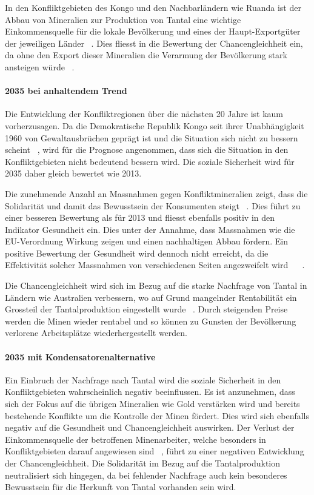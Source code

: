 In den Konfliktgebieten des Kongo und den Nachbarländern wie Ruanda ist der Abbau von 
Mineralien zur Produktion von Tantal eine wichtige Einkommensquelle für die lokale Bevölkerung
und eines der Haupt-Exportgüter der jeweiligen Länder ~\cite{OECProdu81}. Dies fliesst in
die Bewertung der Chancengleichheit ein, da ohne den Export dieser Mineralien die Verarmung
der Bevölkerung stark ansteigen würde ~\cite{DRCongo35}.

\paragraph{2035 bei anhaltendem Trend} Die Entwicklung der Konfliktregionen über die nächsten 20 Jahre
ist kaum vorherzusagen. Da die Demokratische Republik Kongo seit ihrer Unabhängigkeit 1960 von Gewaltausbrüchen geprägt ist und die Situation sich nicht zu bessern scheint ~\cite{Demokrat2}, wird für die 
Prognose angenommen, dass sich die Situation in den Konfliktgebieten nicht bedeutend bessern wird.
Die soziale Sicherheit wird für 2035 daher gleich bewertet wie 2013. 

Die zunehmende Anzahl an Massnahmen gegen Konfliktmineralien zeigt, dass die Solidarität und damit das Bewusstsein
der Konsumenten steigt ~\cite{Didthere42}. Dies führt zu einer besseren Bewertung als für 2013 und fliesst ebenfalls
positiv in den Indikator Gesundheit ein. Dies unter der Annahme, dass Massnahmen wie die EU-Verordnung Wirkung zeigen und einen nachhaltigen Abbau fördern. Ein positive Bewertung der Gesundheit wird dennoch nicht erreicht, da die Effektivität solcher Massnahmen von verschiedenen Seiten angezweifelt wird ~\cite{Demokrat2} ~\cite{TheEUCon25}. 

Die Chancengleichheit wird sich im Bezug auf die starke Nachfrage von Tantal in Ländern wie
Australien verbessern, wo auf Grund mangelnder Rentabilität ein Grossteil der Tantalproduktion  
eingestellt wurde ~\cite{Tantalum12}. Durch steigenden Preise werden die Minen wieder rentabel und 
so können zu Gunsten der Bevölkerung verlorene Arbeitsplätze wiederhergestellt werden.  

\paragraph{2035 mit Kondensatorenalternative} Ein Einbruch der Nachfrage nach Tantal wird die soziale Sicherheit in den Konfliktgebieten wahrscheinlich negativ beeinflussen. Es ist anzunehmen, dass sich der
Fokus auf die übrigen Mineralien wie Gold verstärken wird und bereits bestehende Konflikte um die Kontrolle der 
Minen fördert. Dies wird sich ebenfalls negativ auf die Gesundheit und Chancengleichheit auswirken. Der 
Verlust der Einkommensquelle der betroffenen Minenarbeiter, welche besonders in Konfliktgebieten darauf
angewiesen sind ~\cite{Obamasc19}, führt zu einer negativen Entwicklung der Chancengleichheit. 
Die Solidarität im Bezug auf die Tantalproduktion neutralisiert sich hingegen, da bei fehlender Nachfrage auch 
kein besonderes Bewusstsein für die Herkunft von Tantal vorhanden sein wird.  

